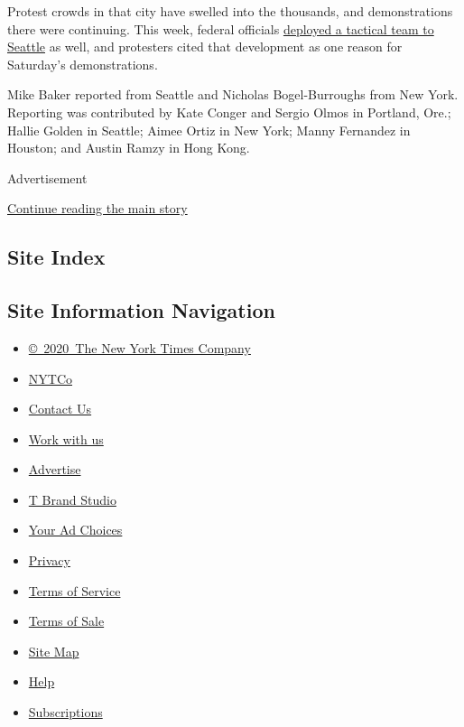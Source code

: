 Protest crowds in that city have swelled into the thousands, and
demonstrations there were continuing. This week, federal officials
\href{https://www.nytimes3xbfgragh.onion/2020/07/23/us/seattle-protests-feds.html}{deployed
a tactical team to Seattle} as well, and protesters cited that
development as one reason for Saturday's demonstrations.

Mike Baker reported from Seattle and Nicholas Bogel-Burroughs from New
York. Reporting was contributed by Kate Conger and Sergio Olmos in
Portland, Ore.; Hallie Golden in Seattle; Aimee Ortiz in New York; Manny
Fernandez in Houston; and Austin Ramzy in Hong Kong.

Advertisement

\protect\hyperlink{after-bottom}{Continue reading the main story}

\hypertarget{site-index}{%
\subsection{Site Index}\label{site-index}}

\hypertarget{site-information-navigation}{%
\subsection{Site Information
Navigation}\label{site-information-navigation}}

\begin{itemize}
\tightlist
\item
  \href{https://help.nytimes3xbfgragh.onion/hc/en-us/articles/115014792127-Copyright-notice}{©~2020~The
  New York Times Company}
\end{itemize}

\begin{itemize}
\tightlist
\item
  \href{https://www.nytco.com/}{NYTCo}
\item
  \href{https://help.nytimes3xbfgragh.onion/hc/en-us/articles/115015385887-Contact-Us}{Contact
  Us}
\item
  \href{https://www.nytco.com/careers/}{Work with us}
\item
  \href{https://nytmediakit.com/}{Advertise}
\item
  \href{http://www.tbrandstudio.com/}{T Brand Studio}
\item
  \href{https://www.nytimes3xbfgragh.onion/privacy/cookie-policy\#how-do-i-manage-trackers}{Your
  Ad Choices}
\item
  \href{https://www.nytimes3xbfgragh.onion/privacy}{Privacy}
\item
  \href{https://help.nytimes3xbfgragh.onion/hc/en-us/articles/115014893428-Terms-of-service}{Terms
  of Service}
\item
  \href{https://help.nytimes3xbfgragh.onion/hc/en-us/articles/115014893968-Terms-of-sale}{Terms
  of Sale}
\item
  \href{https://spiderbites.nytimes3xbfgragh.onion}{Site Map}
\item
  \href{https://help.nytimes3xbfgragh.onion/hc/en-us}{Help}
\item
  \href{https://www.nytimes3xbfgragh.onion/subscription?campaignId=37WXW}{Subscriptions}
\end{itemize}
